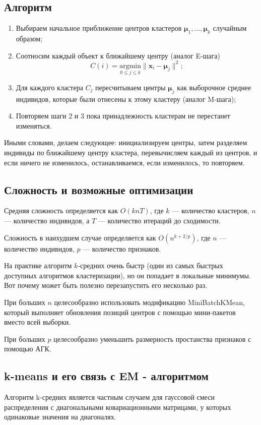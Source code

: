 \documentclass[10pt]{article}
\renewcommand{\leq}{\leqslant}
\begin{document}
	
	\subsection{Алгоритм}
	\begin{enumerate}
		\item Выбираем начальное приближение центров кластеров $\pmb \mu_{1},\ldots, \pmb \mu_{k}$ случайным образом; 
		\item Соотносим каждый объект к ближайшему центру (аналог E-шага) $$C(i) = \underset{0 \leq j \leq k}{\text{argmin}} \|\pmb x_{i} - \pmb \mu_{j} \|^{2};$$
		\item Для каждого кластера $C_{j}$ пересчитываем центры $\pmb \mu_{j}$ как выборочное среднее индивидов, которые были отнесены к этому кластеру (аналог M-шага);
		\item  Повторяем шаги 2 и 3 пока принадлежность кластерам не перестанет изменяться.
	\end{enumerate}
	
	Иными словами, делаем следующее: инициализируем центры, затем разделяем индивиды по ближайшему центру кластера, перевычисляем каждый из центров, и если ничего не изменилось, останавливаемся, если изменилось, то повторяем.
	
	\subsection{Сложность и возможные оптимизации}
	Средняя сложность определяется как $O(k n T)$, где $k$ --- количество кластеров, $n$ --- количество индивидов, а $T$ --- количество итераций до сходимости.
	
	Сложность в наихудшем случае определяется как $O(n^{k+2/p})$, где $n$ --- количество индивидов, $p$ --- количество признаков.
	
	На практике алгоритм $k$-средних очень быстр (один из самых быстрых доступных алгоритмов кластеризации), но он попадает в локальные минимумы. Вот почему может быть полезно перезапустить его несколько раз.
	
	При больших $n$ целесообразно использовать модификацию MiniBatchKMean, который выполняет обновления позиций центров с помощью мини-пакетов вместо всей выборки.
	
	При  больших $p$ целесообразно уменьшить размерность простанства признаков с помощью АГК.
	
	\subsection{k-means и его связь с EM - алгоритмом}
	Алгоритм k-средних является частным случаем для гауссовой смеси распределения с диагональными ковариационными матрицами, у которых одинаковые значения на диагоналях.
	
\end{document}
